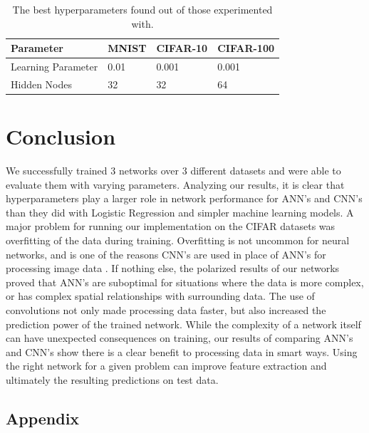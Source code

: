\documentclass[letterpaper]{article} %
\begin{document}
\begin{table}[t]
\begin{centering}
\bgroup
\def\arraystretch{1.5}
\begin{tabular}{| m{} | m{} | m{} | m{} |} 
\hline
Parameter & MNIST & CIFAR-10 & CIFAR-100 \\ 
\hline
\hline
Learning Parameter & 0.01 & 0.001 & 0.001 \\
\hline
Hidden Nodes & 32 & 32 & 64 \\
\hline
\end{tabular}
\caption{The best hyperparameters found out of those experimented with.}
\label{tbl:params}
\egroup
\end{centering}
\end{table}

\section{Conclusion}
We successfully trained 3 networks over 3 different datasets
and were able to evaluate them with varying parameters.
Analyzing our results, it is clear that hyperparameters play a larger role in network performance
for ANN's and CNN's than they did with Logistic Regression and simpler machine learning models.
A major problem for running our implementation on the CIFAR datasets was overfitting
of the data during training.
Overfitting is not uncommon for neural networks, and is one of the reasons CNN's are used in place of ANN's for
processing image data \cite{imagenet}.
If nothing else, the polarized results of our networks proved that
ANN's are suboptimal for situations where the data is more complex,
or has complex spatial relationships with surrounding data.
The use of convolutions not only made processing data faster,
but also increased the prediction power of the trained network.
While the complexity of a network itself can have unexpected consequences on training,
our results of comparing ANN's and CNN's show
there is a clear benefit to processing data in smart ways.
Using the right network for a given problem can
improve feature extraction and ultimately the resulting predictions on test data.




\onecolumn

\pagebreak

\begin{center}
\section*{Appendix}
\label{app:b}
\end{center}
\end{document}
